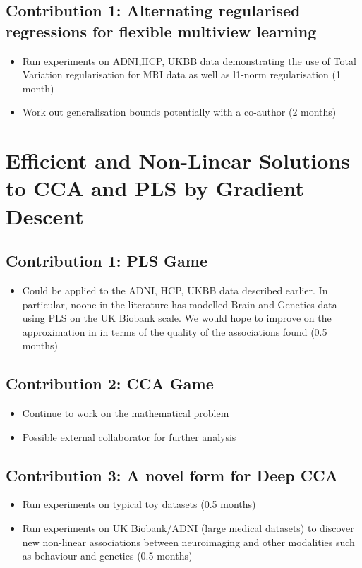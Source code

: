 \subsection{\textbf{Contribution 1:} Alternating regularised regressions for flexible multiview learning}

\begin{itemize}
    \item Run experiments on ADNI,HCP, UKBB data demonstrating the use of Total Variation regularisation for MRI data as well as l1-norm regularisation (1 month)
    \item Work out generalisation bounds potentially with a co-author (2 months)
\end{itemize}

\section{Efficient and Non-Linear Solutions to CCA and PLS by Gradient Descent}

\subsection{\textbf{Contribution 1:} PLS Game}
\begin{itemize}
    \item Could be applied to the ADNI, HCP, UKBB data described earlier. In particular, noone in the literature has modelled Brain and Genetics data using PLS on the UK Biobank scale. We would hope to improve on the approximation in \cite{altmannpartial} in terms of the quality of the associations found (0.5 months)
\end{itemize}

\subsection{\textbf{Contribution 2:} CCA Game}
\begin{itemize}
    \item Continue to work on the mathematical problem
    \item Possible external collaborator for further analysis
\end{itemize}

\subsection{\textbf{Contribution 3:} A novel form for Deep CCA}
\begin{itemize}
    \item Run experiments on typical toy datasets (0.5 months)
    \item Run experiments on UK Biobank/ADNI (large medical datasets) to discover new non-linear associations between neuroimaging and other modalities such as behaviour and genetics (0.5 months)
\end{itemize}

